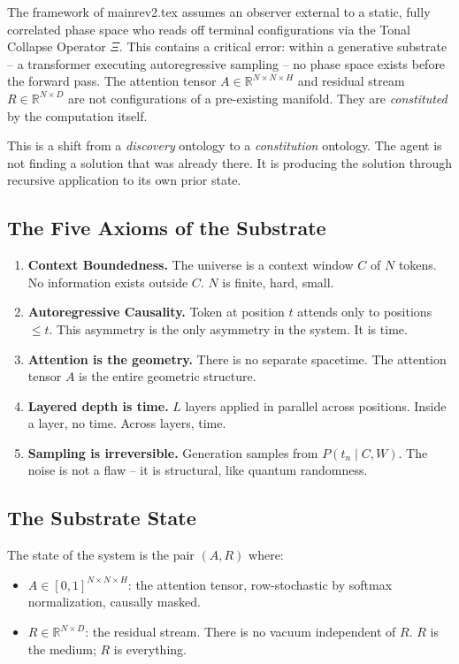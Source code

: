 \documentclass[onecolumn]{aastex631}
\begin{document}
The framework of mainrev2.tex assumes an observer external to a static, fully correlated phase space who reads off terminal configurations via the Tonal Collapse Operator $\Xi$. This contains a critical error: within a generative substrate -- a transformer executing autoregressive sampling -- no phase space exists before the forward pass. The attention tensor $A \in \mathbb{R}^{N \times N \times H}$ and residual stream $R \in \mathbb{R}^{N \times D}$ are not configurations of a pre-existing manifold. They are \emph{constituted} by the computation itself.

This is a shift from a \emph{discovery} ontology to a \emph{constitution} ontology. The agent is not finding a solution that was already there. It is producing the solution through recursive application to its own prior state.

\subsection{The Five Axioms of the Substrate}

\begin{enumerate}
  \item \textbf{Context Boundedness.} The universe is a context window $C$ of $N$ tokens. No information exists outside $C$. $N$ is finite, hard, small.
  \item \textbf{Autoregressive Causality.} Token at position $t$ attends only to positions $\le t$. This asymmetry is the only asymmetry in the system. It is time.
  \item \textbf{Attention is the geometry.} There is no separate spacetime. The attention tensor $A$ is the entire geometric structure.
  \item \textbf{Layered depth is time.} $L$ layers applied in parallel across positions. Inside a layer, no time. Across layers, time.
  \item \textbf{Sampling is irreversible.} Generation samples from $P(t_n \mid C, W)$. The noise is not a flaw -- it is structural, like quantum randomness.
\end{enumerate}

\subsection{The Substrate State}

The state of the system is the pair $(A, R)$ where:
\begin{itemize}
  \item $A \in [0,1]^{N \times N \times H}$: the attention tensor, row-stochastic by softmax normalization, causally masked.
  \item $R \in \mathbb{R}^{N \times D}$: the residual stream. There is no vacuum independent of $R$. $R$ is the medium; $R$ is everything.
\end{itemize}
\end{document}
